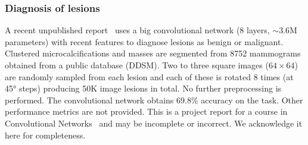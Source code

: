 \subsubsection{Diagnosis of lesions}
\begin{comment}
- not published report
- DDSM database (8752 mammograms)
- only lesion treatment
- they do ~detection (masses vs calcifications) and diagnosis (benign vs malignant).
- two convnest fpr eachtask
- lesions were segmented from the images using the truth labels. 
- Each image is selected so that the shorter dimension is 64 (the other dimension will normally be larger), then 2 to 3 patches are sampled at random positions and each one is rotated 8 times.
- resulted in 50K lesion images
- negative and benign = benign, everything else= malignant
- tried different network sizes.
- accuracy 87%
\end{comment}
A recent unpublished report~\cite{Agarwal2015} uses a big convolutional network (8 layers, $\sim$3.6M parameters) with recent features to diagnose lesions as benign or malignant. Clustered microcalcifications and masses are segmented from 8752 mammograms obtained from a public database (DDSM). Two to three square images ($64 \times 64$) are randomly sampled from each lesion and each of these is rotated 8 times (at 45° steps) producing 50K image lesions in total. No further preprocessing is performed. The convolutional network obtains 69.8\% accuracy on the task. Other performance metrics are not provided. This is a project report for a course in Convolutional Networks~\cite{Karpathy2015} and may be incomplete or incorrect. We acknowledge it here for completeness.

\begin{comment}
- convolutional sparse autoencoder: semisupervised, convolutional networks are trained as a deep sparse autoencoder. Later full classification on the obtained features.
- 50K patches from 1K film mamograms
- does segmentation(background, pectoral muscle and breast tissue), density classification (fatty and dense) and risk scoring/diagnosis (healthy and disease)
- done per pixel.
- http://deep-learning.compute.dtu.dk/wp-content/uploads/2014/08/poster_Diao.pdf.
- Many convolutional networks are trained with segments of different scales and all results from different networks is used in the FC layers
\end{comment}

